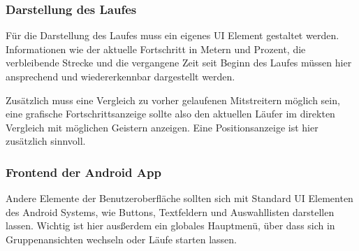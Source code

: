 \subsubsection{Darstellung des Laufes}
Für die Darstellung des Laufes muss ein eigenes UI Element gestaltet werden. Informationen wie der aktuelle Fortschritt in Metern und Prozent, die verbleibende Strecke und die vergangene Zeit seit Beginn des Laufes müssen hier ansprechend und wiedererkennbar dargestellt werden.

Zusätzlich muss eine Vergleich zu vorher gelaufenen Mitstreitern möglich sein, eine grafische Fortschrittsanzeige sollte also den aktuellen Läufer im direkten Vergleich mit möglichen Geistern anzeigen. Eine Positionsanzeige ist hier zusätzlich sinnvoll.
\subsubsection{Frontend der Android App}
Andere Elemente der Benutzeroberfläche sollten sich mit Standard UI Elementen des Android Systems, wie Buttons, Textfeldern und Auswahllisten darstellen lassen. Wichtig ist hier ausßerdem ein globales Hauptmenü, über dass sich in Gruppenansichten wechseln oder Läufe starten lassen.